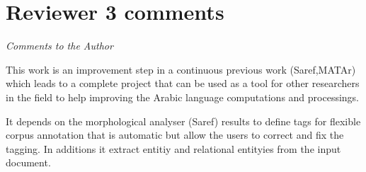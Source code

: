 \section*{Reviewer 3 comments} 
\textit{Comments to the Author}



This work is an improvement step in a continuous previous work 
(Saref,MATAr) which leads to a complete project that can be 
used as a tool for other researchers in the field to help 
improving the Arabic language computations and processings.


It depends on the morphological analyser (Saref) results 
to define tags for flexible corpus annotation that is automatic 
but allow the users to correct and fix the tagging. 
In additions it extract entitiy and relational entityies from 
the input document.


